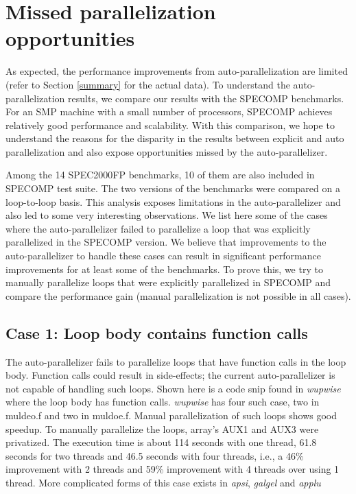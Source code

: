 
\section{Missed parallelization opportunities}
\label{opportunities}

As expected, the performance improvements from auto-parallelization
are limited (refer to Section \ref{summary} for the actual data). To understand the auto-parallelization results, we compare our results with the SPECOMP benchmarks. For an SMP machine with a small number of processors, SPECOMP achieves relatively good performance and scalability. With this comparison, we hope to understand the reasons for the disparity in the results between explicit and auto parallelization and also expose opportunities missed by the auto-parallelizer.

Among the 14 SPEC2000FP benchmarks, 10 of them are also included in
SPECOMP test suite. The two versions of the benchmarks were compared on a loop-to-loop basis. This analysis exposes limitations in the auto-parallelizer and also led to some very interesting observations. We list here some of the cases where the auto-parallelizer failed to parallelize a loop that was explicitly parallelized in the SPECOMP version. We believe that improvements to the auto-parallelizer to handle these cases can result in significant performance
improvements for at least some of the benchmarks. To prove this, we try to manually parallelize loops that were explicitly parallelized in SPECOMP and compare the performance gain (manual parallelization is not possible in all cases).
 

\subsection {Case 1: Loop body contains function calls}

The auto-parallelizer fails to parallelize loops that have function calls in the loop body. Function calls could result in side-effects; the current auto-parallelizer is not capable of handling such loops. 
Shown here is a code snip found in \emph{wupwise} where the loop body has function calls. \emph{wupwise} has four such case, two in muldeo.f and
 two in muldoe.f. Manual parallelization of such loops shows good speedup. To manually parallelize the loops, array's AUX1 and AUX3 were privatized. The execution time is about 114 seconds with one thread, 61.8 seconds for
two threads and 46.5 seconds with four threads, i.e., a 46\% improvement with 2 threads and 59\% improvement with 4 threads over using 1 thread. More complicated forms of this case exists in \emph{apsi}, \emph{galgel} and \emph{applu}

